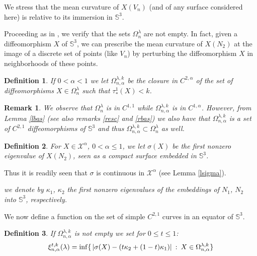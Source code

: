 \documentclass{article}
\def\S3{{\mathbb S^3}}
\newtheorem{definition}{Definition}[section]
\newtheorem{remark}{Remark}[section]
\begin{document}
We stress that the mean curvature of $X(V_n)$ (and of any surface considered here) is relative to its  immersion in $\S3$.

Proceeding  as in \cite[Remark 4.2]{p1}, we verify that the sets $\Omega_{n}^\lambda$ are not empty. In fact, given a diffeomorphism $X$ of $\S3$, we can prescribe the mean curvature of  $X(N_2)$ at the image of a discrete set of points (like $V_n$) by perturbing the diffeomorphism  $X$ in neighborhoods of these points.



\begin{definition} \label{domega2}
If $0<\alpha<1$ we let
$\Omega_{n,\alpha}^{\lambda,{k}}$ be the closure in $C^{2,\alpha}$ of the set of diffeomorphisms $X\in \Omega_{n}^\lambda$ such that $\tau_*^1(X)<{k}$.
\end{definition}


\begin{remark}\label{rred} We observe that $\Omega_{n}^\lambda$ is in $C^{1,1}$ while $\Omega_{n,\alpha}^{\lambda, k}$ is in  $C^{1,\alpha}$.  However, from Lemma \ref{lbas} (see also remarks \ref{resc} and \ref{rbas}) we also have that $\Omega_{n,\alpha}^{\lambda,{k}}$ is a set of $C^{2,1}$ diffeomorphisms of $\S3$ and thus 
$\Omega_{n,\alpha}^{\lambda,{k}}\subset \Omega_{n}^\lambda$ as well.
\end{remark}






\begin{definition}\label{dsigma} For $X\in \mathcal X^\alpha$, $0<\alpha\leq 1$, we let $\sigma(X)$ be the first nonzero eigenvalue of $X(N_2)$, seen as a compact surface embedded in $\S3$. 
\end{definition}
Thus it is readily seen that $\sigma$ is continuous in $\mathcal X^\alpha$ (see Lemma \ref{lsigma}).

\smallskip
{} {\it we denote by $\kappa_1$, $\kappa_2$ the first nonzero eigenvalues of the embeddings of $N_1$, $N_2$ into $\S3$, respectively.}\smallskip


We now define a function on the set of simple $C^{2,1}$ curves in an equator of $\S3$.

\begin{definition}\label{dxi}
 If $\Omega^{\lambda,k}_{n,\alpha}$ is not empty we set for $0\leq t\leq 1$:
\begin{equation}\label{eqxi}
\xi_{n,\alpha}^{t,k}(\lambda)=\inf\{\hspace{.02in}|\sigma(X)-(t\kappa_2+(1-t)\kappa_1)|\hspace{.03in}:\hspace{.03in}{X\in \Omega^{\lambda,k}_{n,\alpha}} \}
\end{equation}
\end{definition} \medskip
\end{document}
